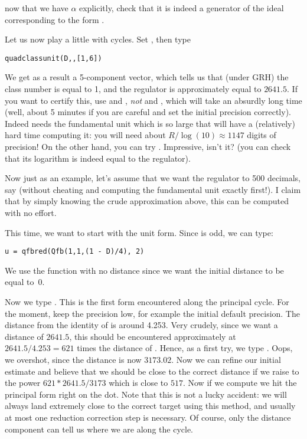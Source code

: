  now that we have $\alpha$ explicitly, check that it
is indeed a generator of the ideal corresponding to the form .

\medskip Let us now play a little with cycles. Set ,
then type

\centerline{\tt quadclassunit(D,,[1,6])}

We get as a result a 5-component vector, which tells us that (under GRH) the
class number is equal to 1, and the regulator is approximately
equal to $2641.5$. If you want to certify this, use  and
, {\it not}  and , which will
take an absurdly long time (well, about 5 minutes if you are careful and set
the initial precision correctly). Indeed  needs the fundamental
unit which is so large that  will have a (relatively) hard time
computing it: you will need about $R/\log(10)\approx 1147$ digits of precision!
On the other hand, you can try . Impressive, isn't it? (you
can check that its logarithm is indeed equal to the regulator).

Now just as an example, let's assume that we want the regulator to 500
decimals, say (without cheating and computing the fundamental unit exactly
first!). I claim that by simply knowing the crude approximation above, this
can be computed with no effort.

This time, we want to start with the unit form. Since  is odd, we can
type:

\centerline{\tt u = qfbred(Qfb(1,1,(1 - D)/4), 2)}

We use the function  with no distance since we want the initial
distance to be equal to~0.

Now we type  . This is the first form encountered along
the principal cycle. For the moment, keep the precision low, for example the
initial default precision. The distance from the identity of  is
around 4.253. Very crudely, since we want a distance of $2641.5$, this should
be encountered approximately at $2641.5/4.253=621$ times the distance of
. Hence, as a first try, we type . Oops, we overshot,
since the distance is now $3173.02$. Now we can refine our initial estimate and
believe that we should be close to the correct distance if we raise  to
the power $621*2641.5/3173$ which is close to $517$. Now if we compute
 we hit the principal form right on the dot. Note that this is
not a lucky accident: we will always land extremely close to the correct target
using this method, and usually at most one reduction correction step is
necessary. Of course, only the distance component can tell us where we are
along the cycle.

